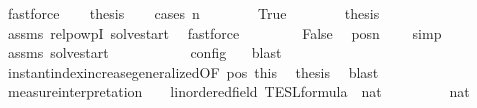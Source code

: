 \begin{isabellebody}
\ fastforce\isanewline
\ \ \isamarkupfalse%
\ {\isacharquery}thesis\isanewline
\ \ \isamarkupfalse%
\ {\isacharparenleft}cases\ {\isacartoucheopen}n\ {\isacharequal}\ {}{\isacartoucheclose}{\isacharparenright}\isanewline
\ \ \ \ \isamarkupfalse%
\ True\isanewline
\ \ \ \ \ \ \isamarkupfalse%
\ {\isacharquery}thesis\ \isamarkupfalse%
\ assms\ relpowp{\isacharunderscore}{}{\isacharunderscore}I\ solve{\isacharunderscore}start\ \isamarkupfalse%
\ fastforce\isanewline
\ \ \isamarkupfalse%
\isanewline
\ \ \ \ \isamarkupfalse%
\ False\ \isamarkupfalse%
\ pos{\isacharcolon}{\isacartoucheopen}n\ {\isachargreater}\ {}{\isacartoucheclose}\ \isamarkupfalse%
\ simp\isanewline
\ \ \ \ \ \ \isamarkupfalse%
\ assms\ solve{\isacharunderscore}start\ \isamarkupfalse%
\ {\isacartoucheopen}{\isasymrho}\ {\isasymin}\ {\isasymlbrakk}\ {\isacharbrackleft}{\isacharbrackright}{\isacharcomma}\ {}\ {\isasymturnstile}\ {\isasymPsi}\ {\isasymtriangleright}\ {\isacharbrackleft}{\isacharbrackright}\ {\isasymrbrakk}\isactrlsub c\isactrlsub o\isactrlsub n\isactrlsub f\isactrlsub i\isactrlsub g\ {\isacartoucheclose}\ \isamarkupfalse%
\ blast\isanewline
\ \ \ \ \ \ \isamarkupfalse%
\ instant{\isacharunderscore}index{\isacharunderscore}increase{\isacharunderscore}generalized{\isacharbrackleft}OF\ pos\ this{\isacharbrackright}\ \isamarkupfalse%
\ {\isacharquery}thesis\ \isamarkupfalse%
\ blast\isanewline
\ \ \isamarkupfalse%
\isanewline
{}\isamarkupfalse%
%
\endisatagproof
{\isafoldproof}%
%
\isadelimproof
%
\endisadelimproof
%
\isadelimdocument
%
\endisadelimdocument
%
\isatagdocument
%
\isamarkuptrue%
%
\endisatagdocument
{\isafolddocument}%
%
\isadelimdocument
%
\endisadelimdocument
{}\isamarkupfalse%
\ measure{\isacharunderscore}interpretation\ {\isacharcolon}{\isacharcolon}\ {\isacartoucheopen}{\isacharprime}{\isasymtau}\ {\isacharcolon}{\isacharcolon}\ linordered{\isacharunderscore}field\ TESL{\isacharunderscore}formula\ {\isasymRightarrow}\ nat{\isacartoucheclose}\ {\isacharparenleft}{\isachardoublequoteopen}{\isasymmu}{\isachardoublequoteclose}{\isacharparenright}\ \isanewline
\ \ \ \ {\isacartoucheopen}{\isasymmu}\ {\isacharbrackleft}{\isacharbrackright}\ {\isacharequal}\ {\isacharparenleft}{}{\isacharcolon}{\isacharcolon}nat{\isacharparenright}{\isacartoucheclose}\isanewline

\end{isabellebody}
